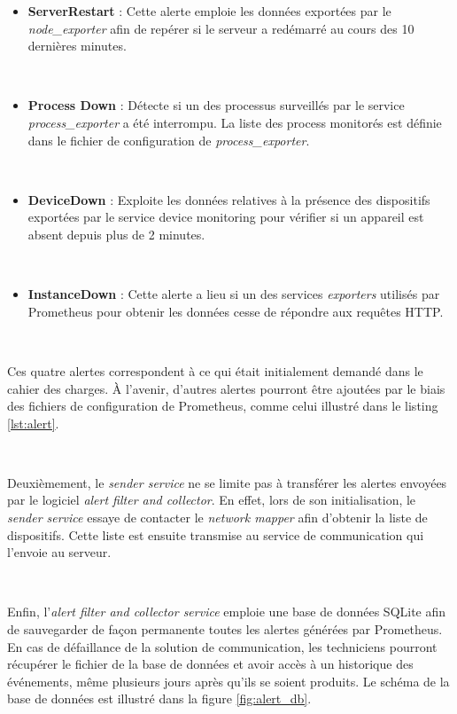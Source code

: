 \begin{itemize}
  \item \textbf{ServerRestart} : Cette alerte emploie les données exportées par le \textit{node\_exporter} afin de repérer si le serveur a redémarré au cours des 10 dernières minutes.

  ~

  \item \textbf{Process Down} : Détecte si un des processus surveillés par le service \textit{process\_exporter} a été interrompu. La liste des process monitorés est définie dans le fichier de configuration de \textit{process\_exporter}.

  ~

  \item \textbf{DeviceDown} : Exploite les données relatives à la présence des dispositifs exportées par le service device monitoring pour vérifier si un appareil est absent depuis plus de 2 minutes.

    ~

  \item \textbf{InstanceDown} : Cette alerte a lieu si un des services \textit{exporters} utilisés par Prometheus pour obtenir les données cesse de répondre aux requêtes HTTP.
\end{itemize}

~

\noindent
Ces quatre alertes correspondent à ce qui était initialement demandé dans le cahier des charges. À l'avenir, d'autres alertes pourront être ajoutées par le biais des fichiers de configuration de Prometheus, comme celui illustré dans le listing \ref{lst:alert}.

~

\noindent
Deuxièmement, le \textit{sender service} ne se limite pas à transférer les alertes envoyées par le logiciel \textit{alert filter and collector}. En effet, lors de son initialisation, le \textit{sender service} essaye de contacter le \textit{network mapper} afin d’obtenir la liste de dispositifs. Cette liste est ensuite transmise au service de communication qui l’envoie au serveur.

~

\noindent
Enfin, l'\textit{alert filter and collector service} emploie une base de données SQLite afin de sauvegarder de façon permanente toutes les alertes générées par Prometheus. En cas de défaillance de la solution de communication, les techniciens pourront récupérer le fichier de la base de données et avoir accès à un historique des événements, même plusieurs jours après qu'ils se soient produits. Le schéma de la base de données est illustré dans la figure \ref{fig:alert_db}.


